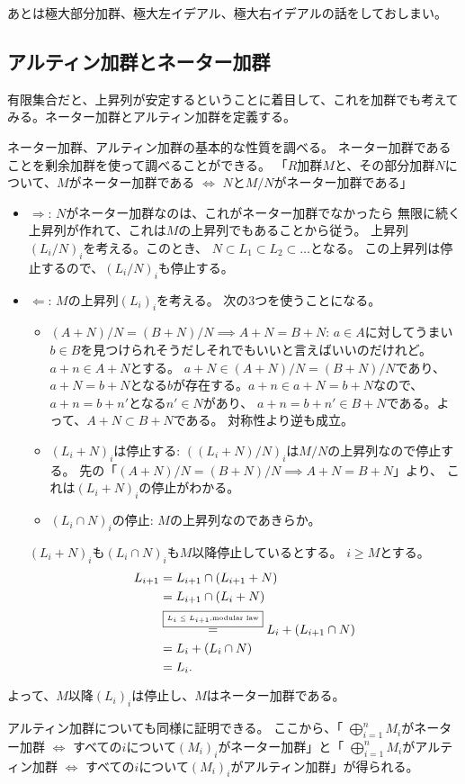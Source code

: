 \documentclass[9pt]{ltjsarticle}
\begin{document}
あとは極大部分加群、極大左イデアル、極大右イデアルの話をしておしまい。

\subsection{アルティン加群とネーター加群}
\label{sub:アルティン加群とネーター加群}
有限集合だと、上昇列が安定するということに着目して、これを加群でも考えてみる。ネーター加群とアルティン加群を定義する。

ネーター加群、アルティン加群の基本的な性質を調べる。
ネーター加群であることを剰余加群を使って調べることができる。
「$R$加群$M$と、その部分加群$N$について、$M$がネーター加群である
$\iff$ $N$と$M/N$がネーター加群である」
\begin{myproof}
  \begin{itemize}
    \item $\Rightarrow$:
    $N$がネーター加群なのは、これがネーター加群でなかったら
    無限に続く上昇列が作れて、これは$M$の上昇列でもあることから従う。
    上昇列$(L_i/N)_i$を考える。このとき、
    $N \subset L_1 \subset L_2 \subset \dots$となる。
    この上昇列は停止するので、$(L_i/N)_i$も停止する。
    \item $\Leftarrow$:
    $M$の上昇列$(L_i)_i$を考える。
    次の3つを使うことになる。
    \begin{itemize}
      \item $(A+N)/N = (B+N)/N \implies A+N = B+N$:
      $a\in A$に対してうまい$b\in B$を見つけられそうだしそれでもいいと言えばいいのだけれど。$a + n\in A+N$とする。
      $a + N \in (A+N)/N = (B+N)/N$であり、$a + N= b + N$となる$b$が存在する。$a+n \in a+ N = b+N$なので、$a+n = b+n'$となる$n' \in N$があり、
      $a+n = b+n' \in B+N$である。よって、$A+N \subset B+N$である。
      対称性より逆も成立。
      \item $(L_i+N)_i$は停止する:
      $((L_i+N)/N)_i$は$M/N$の上昇列なので停止する。
      先の「$(A+N)/N = (B+N)/N \implies A+N = B+N$」より、
      これは$(L_i+N)_i$の停止がわかる。
      \item $(L_i \cap N)_i$の停止:
      $M$の上昇列なのであきらか。
    \end{itemize}
    $(L_i+N)_i$も$(L_i\cap N)_i$も$M$以降停止しているとする。
    $i\ge M$とする。
    \begin{align}
      L_{i+1}
      &=
      L_{i+1} \cap (L_{i+1} + N)\\
      &=
      L_{i+1}\cap (L_i + N)\\
      &\overset{\text{\fbox{\tiny $L_i \le L_{i+1}$,modular law}}}{=}
      L_i + (L_{i+1} \cap N)\\
      &=
      L_i + (L_i \cap N)\\
      &=
      L_i.
    \end{align}
  \end{itemize}
  よって、$M$以降$(L_i)_i$は停止し、$M$はネーター加群である。
\end{myproof}
アルティン加群についても同様に証明できる。
ここから、「
$\bigoplus_{i=1}^n M_i$がネーター加群 $\iff$ すべての$i$について$(M_i)_i$がネーター加群」と「
$\bigoplus_{i=1}^n M_i$がアルティン加群 $\iff$ すべての$i$について$(M_i)_i$がアルティン加群」が得られる。
\end{document}
